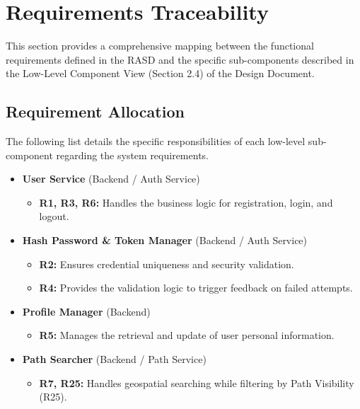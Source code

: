 \section{Requirements Traceability}

This section provides a comprehensive mapping between the functional requirements defined in the RASD and the specific sub-components described in the Low-Level Component View (Section 2.4) of the Design Document.

\subsection{Requirement Allocation}
The following list details the specific responsibilities of each low-level sub-component regarding the system requirements.

\begin{itemize}
    \item \textbf{User Service} (Backend / Auth Service)
    \begin{itemize}
        \item \textbf{R1, R3, R6:} Handles the business logic for registration, login, and logout.
    \end{itemize}

    \item \textbf{Hash Password \& Token Manager} (Backend / Auth Service)
    \begin{itemize}
        \item \textbf{R2:} Ensures credential uniqueness and security validation.
        \item \textbf{R4:} Provides the validation logic to trigger feedback on failed attempts.
    \end{itemize}

    \item \textbf{Profile Manager} (Backend)
    \begin{itemize}
        \item \textbf{R5:} Manages the retrieval and update of user personal information.
    \end{itemize}

    \item \textbf{Path Searcher} (Backend / Path Service)
    \begin{itemize}
        \item \textbf{R7, R25:} Handles geospatial searching while filtering by Path Visibility (R25).
    \end{itemize}


\end{itemize}
